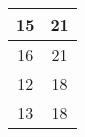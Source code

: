 \begin{table}[H]
\begin{tabular}{cc}
\multicolumn{1}{|c|}{15}                                                        & \multicolumn{1}{c|}{21}                                                             \\ \hline
\multicolumn{1}{|c|}{16}                                                        & \multicolumn{1}{c|}{21}                                                             \\ \hline
\multicolumn{1}{|c|}{12}                                                        & \multicolumn{1}{c|}{18}                                                             \\ \hline
\multicolumn{1}{|c|}{13}                                                        & \multicolumn{1}{c|}{18}                                                             \\ \hline
\end{tabular}\end{table}